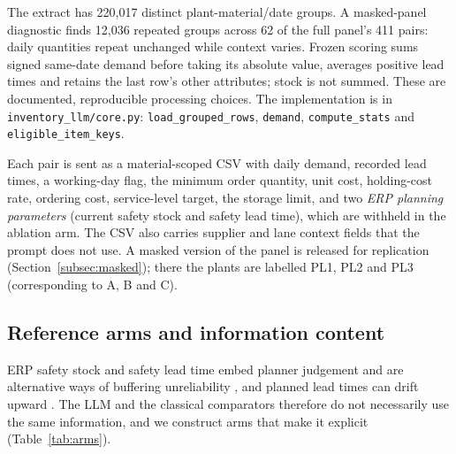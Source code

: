 \documentclass[preprint,12pt,nonatbib]{elsarticle}
\let\cite\parencite
\begin{document}
The extract has 220{,}017 distinct plant-material/date groups. A masked-panel diagnostic finds 12{,}036 repeated groups across 62 of the full panel's 411 pairs: daily quantities repeat unchanged while context varies. Frozen scoring sums signed same-date demand before taking its absolute value, averages positive lead times and retains the last row's other attributes; stock is not summed. These are documented, reproducible processing choices. The implementation is in \texttt{inventory\_llm/core.py}: \texttt{load\_grouped\_rows}, \texttt{demand}, \texttt{compute\_stats} and \texttt{eligible\_item\_keys}.

Each pair is sent as a material-scoped CSV with daily demand, recorded lead times, a working-day flag, the minimum order quantity, unit cost, holding-cost rate, ordering cost, service-level target, the storage limit, and two \emph{ERP planning parameters} (current safety stock and safety lead time), which are withheld in the ablation arm. The CSV also carries supplier and lane context fields that the prompt does not use. A masked version of the panel is released for replication (Section~\ref{subsec:masked}); there the plants are labelled PL1, PL2 and PL3 (corresponding to A, B and C).

\subsection{Reference arms and information content}
\label{subsec:arms}
ERP safety stock and safety lead time embed planner judgement and are alternative ways of buffering unreliability \cite{vanKampen2010safety}, and planned lead times can drift upward \cite{thurer2022planned}. The LLM and the classical comparators therefore do not necessarily use the same information, and we construct arms that make it explicit (Table~\ref{tab:arms}).
\end{document}
